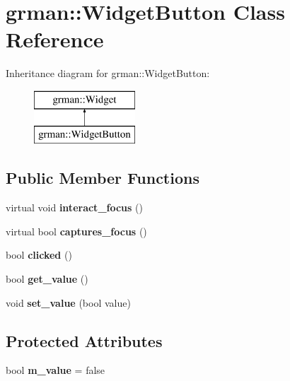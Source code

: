 \hypertarget{classgrman_1_1_widget_button}{}\section{grman\+:\+:Widget\+Button Class Reference}
\label{classgrman_1_1_widget_button}
Inheritance diagram for grman\+:\+:Widget\+Button\+:\begin{figure}[H]
\begin{center}
\leavevmode
\includegraphics[height=2.000000cm]{classgrman_1_1_widget_button}
\end{center}
\end{figure}
\subsection*{Public Member Functions}
\begin{DoxyCompactItemize}
\item 
\mbox{\label{classgrman_1_1_widget_button_aba1ce188474cc3c0feea1ae5a8d28117}} 
virtual void {\bfseries interact\+\_\+focus} ()
\item 
\mbox{\label{classgrman_1_1_widget_button_a11e2dbaa31e7b1787c69281564a5d248}} 
virtual bool {\bfseries captures\+\_\+focus} ()
\item 
\mbox{\label{classgrman_1_1_widget_button_a3460c3ffbad5cee3de9b58c032300b84}} 
bool {\bfseries clicked} ()
\item 
\mbox{\label{classgrman_1_1_widget_button_a66f18e14fc5d97f2c3f2af0c65420770}} 
bool {\bfseries get\+\_\+value} ()
\item 
\mbox{\label{classgrman_1_1_widget_button_a2238b547dfb79663c9a3555aa06f87f3}} 
void {\bfseries set\+\_\+value} (bool value)
\end{DoxyCompactItemize}
\subsection*{Protected Attributes}
\begin{DoxyCompactItemize}
\item 
\mbox{\label{classgrman_1_1_widget_button_a08dc2cd729c616d855dd3b226ee8082a}} 
bool {\bfseries m\+\_\+value} = false
\end{DoxyCompactItemize}


